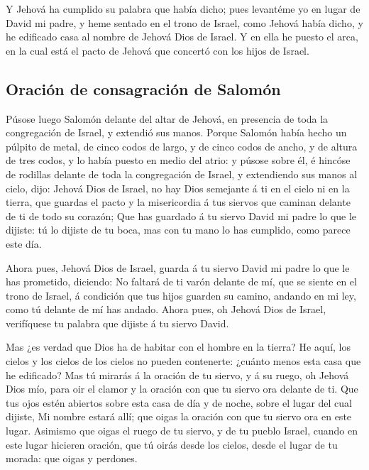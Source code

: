  Y Jehová ha cumplido su palabra que había dicho; pues
levantéme yo en lugar de David mi padre, y heme sentado en el trono de
Israel, como Jehová había dicho, y he edificado casa al nombre de Jehová
Dios de Israel.  Y en ella he puesto el arca, en la cual
está el pacto de Jehová que concertó con los hijos de Israel.

\hypertarget{oraciuxf3n-de-consagraciuxf3n-de-salomuxf3n}{%
\subsection{Oración de consagración de
Salomón}\label{oraciuxf3n-de-consagraciuxf3n-de-salomuxf3n}}

 Púsose luego Salomón delante del altar de Jehová, en
presencia de toda la congregación de Israel, y extendió sus manos.
 Porque Salomón había hecho un púlpito de metal, de cinco
codos de largo, y de cinco codos de ancho, y de altura de tres codos, y
lo había puesto en medio del atrio: y púsose sobre él, é hincóse de
rodillas delante de toda la congregación de Israel, y extendiendo sus
manos al cielo, dijo:  Jehová Dios de Israel, no hay Dios
semejante á ti en el cielo ni en la tierra, que guardas el pacto y la
misericordia á tus siervos que caminan delante de ti de todo su corazón;
 Que has guardado á tu siervo David mi padre lo que le
dijiste: tú lo dijiste de tu boca, mas con tu mano lo has cumplido, como
parece este día.

 Ahora pues, Jehová Dios de Israel, guarda á tu siervo
David mi padre lo que le has prometido, diciendo: No faltará de ti varón
delante de mí, que se siente en el trono de Israel, á condición que tus
hijos guarden su camino, andando en mi ley, como tú delante de mí has
andado.  Ahora pues, oh Jehová Dios de Israel, verifíquese
tu palabra que dijiste á tu siervo David.

 Mas ¿es verdad que Dios ha de habitar con el hombre en la
tierra? He aquí, los cielos y los cielos de los cielos no pueden
contenerte: ¿cuánto menos esta casa que he edificado?  Mas
tú mirarás á la oración de tu siervo, y á su ruego, oh Jehová Dios mío,
para oir el clamor y la oración con que tu siervo ora delante de ti.
 Que tus ojos estén abiertos sobre esta casa de día y de
noche, sobre el lugar del cual dijiste, Mi nombre estará allí; que oigas
la oración con que tu siervo ora en este lugar.  Asimismo
que oigas el ruego de tu siervo, y de tu pueblo Israel, cuando en este
lugar hicieren oración, que tú oirás desde los cielos, desde el lugar de
tu morada: que oigas y perdones.

